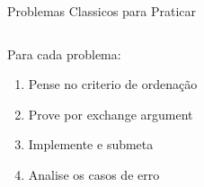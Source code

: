 \documentclass[aspectratio=169,10pt]{beamer}
\begin{document}
\begin{frame}{Problemas Classicos para Praticar}
\begin{columns}[t]
      \begin{tcolorbox}[caixaAmarelo,title={Dica de estudo}]
        \footnotesize
        Para cada problema:\\
        \begin{enumerate}\footnotesize
          \item Pense no criterio de ordenação
          \item Prove por exchange argument
          \item Implemente e submeta
          \item Analise os casos de erro
        \end{enumerate}
      \end{tcolorbox}
  \end{columns}
\end{frame}
\end{document}
